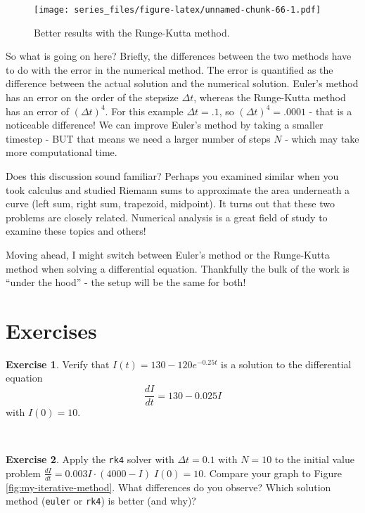 \documentclass[
]{book}
\theoremstyle{definition}
\theoremstyle{definition}
\theoremstyle{definition}
\newtheorem{exercise}{Exercise}[chapter]
\theoremstyle{remark}
\begin{document}
\begin{figure}
\centering
\texttt{[image: series\_files/figure-latex/unnamed-chunk-66-1.pdf]}
\caption{\label{fig:unnamed-chunk-66}Better results with the Runge-Kutta method.}
\end{figure}

So what is going on here? Briefly, the differences between the two methods have to do with the error in the numerical method. The error is quantified as the difference between the actual solution and the numerical solution. Euler's method has an error on the order of the stepsize \(\Delta t\), whereas the Runge-Kutta method has an error of \((\Delta t)^4\). For this example \(\Delta t = .1\), so \((\Delta t)^{4} =.0001\) - that is a noticeable difference! We can improve Euler's method by taking a smaller timestep - BUT that means we need a larger number of steps \(N\) - which may take more computational time.

Does this discussion sound familiar? Perhaps you examined similar when you took calculus and studied Riemann sums to approximate the area underneath a curve (left sum, right sum, trapezoid, midpoint). It turns out that these two problems are closely related. Numerical analysis is a great field of study to examine these topics and others!

Moving ahead, I might switch between Euler's method or the Runge-Kutta method when solving a differential equation. Thankfully the bulk of the work is ``under the hood'' - the setup will be the same for both!

\newpage

\hypertarget{exercises-3}{%
\section{Exercises}\label{exercises-3}}

\begin{exercise}
\protect\hypertarget{exr:unnamed-chunk-67}{}{\label{exr:unnamed-chunk-67} }Verify that \(I(t) = 130-120e^{-0.25t}\) is a solution to the differential equation \[\displaystyle \frac{dI}{dt} = 130-0.025I \] with \(I(0)=10\).
\end{exercise}

~

\begin{exercise}
\protect\hypertarget{exr:unnamed-chunk-68}{}{\label{exr:unnamed-chunk-68} }Apply the \texttt{rk4} solver with \(\Delta t = 0.1\) with \(N=10\) to the initial value problem \(\displaystyle \frac{dI}{dt} = 0.003 I \cdot (4000-I) \; I(0)=10\). Compare your graph to Figure \ref{fig:my-iterative-method}. What differences do you observe? Which solution method (\texttt{euler} or \texttt{rk4}) is better (and why)?
\end{exercise}
\end{document}
